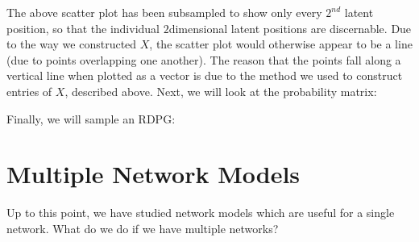 \documentclass[letterpaper,10pt,english]{jupyterBook}
\begin{document}
\noindent{}

\sphinxAtStartPar
The above scatter plot has been subsampled to show only every \(2^{nd}\) latent position, so that the individual \(2\)\sphinxhyphen{}dimensional latent positions are discernable. Due to the way we constructed \(X\), the scatter plot would otherwise appear to be a line (due to points overlapping one another). The reason that the points fall along a vertical line when plotted as a vector is due to the method we used to construct entries of \(X\), described above. Next, we will look at the probability matrix:

\noindent{}

\sphinxAtStartPar
Finally, we will sample an RDPG:

\begin{sphinxVerbatim}[commandchars=\\\{\}]
   
   

    

   
\end{sphinxVerbatim}

\noindent{}


\section{Multiple Network Models}
\label{\detokenize{representations/ch5/multi-network-models:multiple-network-models}}\label{\detokenize{representations/ch5/multi-network-models::doc}}
\sphinxAtStartPar
Up to this point, we have studied network models which are useful for a single network. What do we do if we have multiple networks?
\end{document}

